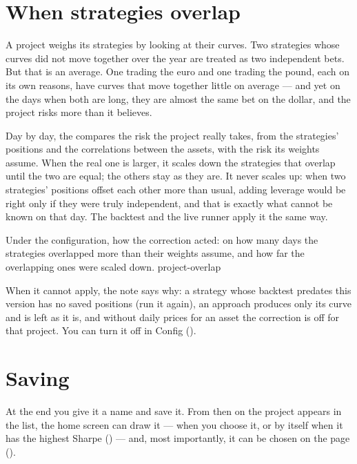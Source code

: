 \section{When strategies overlap}\label{sez:project-overlap}

A project weighs its strategies by looking at their curves. Two strategies
whose curves did not move together over the year are treated as two
independent bets. But that is an average. One trading the euro and one
trading the pound, each on its own reasons, have curves that move together
little on average --- and yet on the days when both are long, they are
almost the same bet on the dollar, and the project risks more than it
believes.

Day by day, the  compares the risk the project
really takes, from the strategies' positions and the correlations between
the assets, with the risk its weights assume. When the real one is larger, it
scales down the strategies that overlap until the two are equal; the others
stay as they are. It never scales up: when two strategies' positions offset
each other more than usual, adding leverage would be right only if they were
truly independent, and that is exactly what cannot be known on that day.
The backtest and the live runner apply it the same way.

  {Under the configuration, how the correction acted: on how many days the
   strategies overlapped more than their weights assume, and how far the
   overlapping ones were scaled down.}
  {project-overlap}

\noindent
When it cannot apply, the note says why: a strategy whose backtest predates
this version has no saved positions (run it again), an approach produces only
its curve and is left as it is, and without daily prices for an asset the
correction is off for that project. You can turn it off in Config
().

\section{Saving}\label{sez:projects-save}

At the end you give it a name and save it. From then on the project appears
in the list, the home screen can draw it --- when you choose it, or by itself
when it has the highest Sharpe () --- and, most
importantly, it can be chosen on the  page ().

